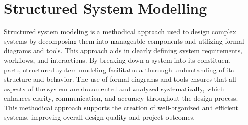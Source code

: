 \section{Structured System Modelling }
Structured system modeling is a methodical approach used to design complex systems by decomposing them into manageable components and utilizing formal diagrams and tools. This approach aids in clearly defining system requirements, workflows, and interactions. By breaking down a system into its constituent parts, structured system modeling facilitates a thorough understanding of its structure and behavior. The use of formal diagrams and tools ensures that all aspects of the system are documented and analyzed systematically, which enhances clarity, communication, and accuracy throughout the design process. This methodical approach supports the creation of well-organized and efficient systems, improving overall design quality and project outcomes.
\newpage

